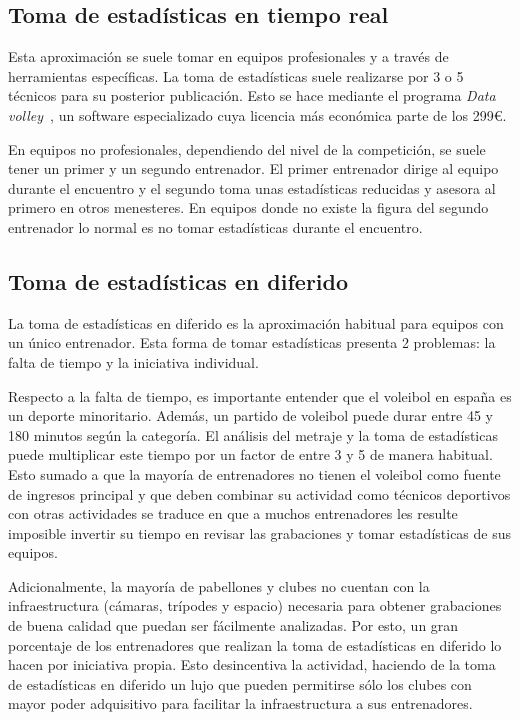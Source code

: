\documentclass[12pt]{report} %
\begin{document}
    \subsection{Toma de estadísticas en tiempo real}
    
    Esta aproximación se suele tomar en equipos profesionales y a través de
    herramientas específicas. La toma de estadísticas suele realizarse por 3 o
    5 técnicos para su posterior publicación. Esto se hace mediante el programa
    \textit{Data volley}~\cite{datavoley}, un software especializado cuya
    licencia más económica parte de los 299\euro. 

    En equipos no profesionales, dependiendo del nivel de la competición, se
    suele tener un primer y un segundo entrenador. El primer entrenador dirige
    al equipo durante el encuentro y el segundo toma unas estadísticas
    reducidas y asesora al primero en otros menesteres. En equipos donde no
    existe la figura del segundo entrenador lo normal es no tomar estadísticas
    durante el encuentro.

    \subsection{Toma de estadísticas en diferido}

    La toma de estadísticas en diferido es la aproximación habitual para
    equipos con un único entrenador. Esta forma de tomar estadísticas presenta
    2 problemas: la falta de tiempo y la iniciativa individual.

    Respecto a la falta de tiempo, es importante entender que el voleibol en
    españa es un deporte minoritario. Además, un partido de voleibol puede durar
    entre 45 y 180 minutos según la categoría. El análisis del metraje y la
    toma de estadísticas puede multiplicar este tiempo por un factor de entre 3
    y 5 de manera habitual. Esto sumado a que la mayoría de entrenadores no
    tienen el voleibol como fuente de ingresos principal y que deben combinar
    su actividad como técnicos deportivos con otras actividades se
    traduce en que a muchos entrenadores les resulte imposible invertir su
    tiempo en revisar las grabaciones y tomar estadísticas de sus equipos.

    Adicionalmente, la mayoría de pabellones y clubes no cuentan con la
    infraestructura (cámaras, trípodes y espacio) necesaria para obtener
    grabaciones de buena calidad que puedan ser fácilmente analizadas. Por esto, 
    un gran porcentaje de los entrenadores que realizan la toma de estadísticas
    en diferido lo hacen por iniciativa propia. Esto desincentiva la actividad,
    haciendo de la toma de estadísticas en diferido un lujo que pueden
    permitirse sólo los clubes con mayor poder adquisitivo para facilitar la
    infraestructura a sus entrenadores.
    
\end{document}

